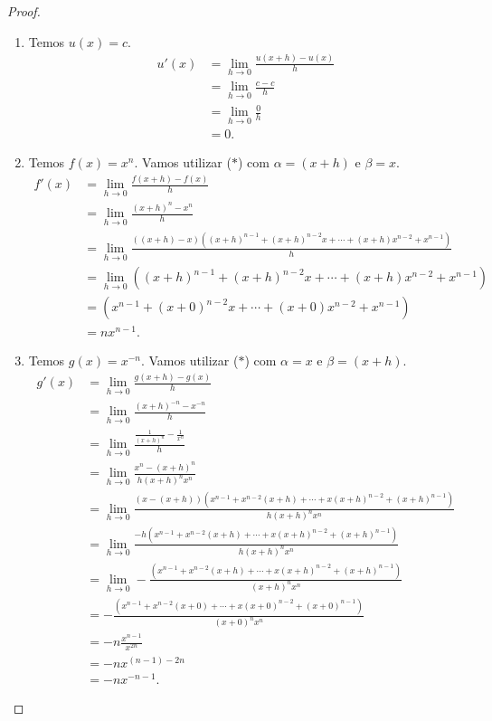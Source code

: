 \begin{proof}
	\begin{enumerate}
		
		\item Temos $u(x)=c$.
		\begin{align*}
		u'(x)
			&=\lim_{h\to 0}\frac{u(x+h)-u(x)}{h}\\
			&=\lim_{h\to 0}\frac{c-c}{h}\\
			&=\lim_{h\to 0}\frac{0}{h}\\
			&=0.
		\end{align*}
		
		\item Temos $f(x)=x^n$. Vamos utilizar ($*$) com $\alpha=(x+h)$ e $\beta=x$.
		\begin{align*}
			f'(x)
				&=\lim_{h\to 0}\frac{f(x+h)-f(x)}{h}\\
				&=\lim_{h\to 0}\frac{(x+h)^n-x^n}{h}\\
				&=\lim_{h\to 0}\frac{((x+h)-x)((x+h)^{n-1}+(x+h)^{n-2}x+\cdots+(x+h)x^{n-2}+x^{n-1})}{h}\\
				&=\lim_{h\to 0}((x+h)^{n-1}+(x+h)^{n-2}x+\cdots+(x+h)x^{n-2}+x^{n-1})\\
				&=(x^{n-1}+(x+0)^{n-2}x+\cdots+(x+0)x^{n-2}+x^{n-1})\\
				&=nx^{n-1}.
		\end{align*}
		
		\item Temos $g(x)=x^{-n}$. Vamos utilizar ($*$) com $\alpha=x$ e $\beta=(x+h)$.
		\begin{align*}
			g'(x)
				&=\lim_{h\to 0}\frac{g(x+h)-g(x)}{h}\\
				&=\lim_{h\to 0}\frac{(x+h)^{-n}-x^{-n}}{h}\\
				&=\lim_{h\to 0}\frac{\frac{1}{(x+h)^n}-\frac{1}{x^n}}{h}\\
				&=\lim_{h\to 0}\frac{x^n-(x+h)^n}{h(x+h)^nx^n}\\
				&=\lim_{h\to 0}\frac{(x-(x+h))(x^{n-1}+x^{n-2}(x+h)+\cdots+x(x+h)^{n-2}+(x+h)^{n-1})}{h(x+h)^nx^n}\\
				&=\lim_{h\to 0}\frac{-h(x^{n-1}+x^{n-2}(x+h)+\cdots+x(x+h)^{n-2}+(x+h)^{n-1})}{h(x+h)^nx^n}\\
				&=\lim_{h\to 0}-\frac{(x^{n-1}+x^{n-2}(x+h)+\cdots+x(x+h)^{n-2}+(x+h)^{n-1})}{(x+h)^nx^n}\\
				&=-\frac{(x^{n-1}+x^{n-2}(x+0)+\cdots+x(x+0)^{n-2}+(x+0)^{n-1})}{(x+0)^nx^n}\\
				&=-n\frac{x^{n-1}}{x^{2n}}\\
				&=-n x^{(n-1)-2n}\\
				&=-n x^{-n-1}.
		\end{align*}
		

\end{enumerate}
\end{proof}
